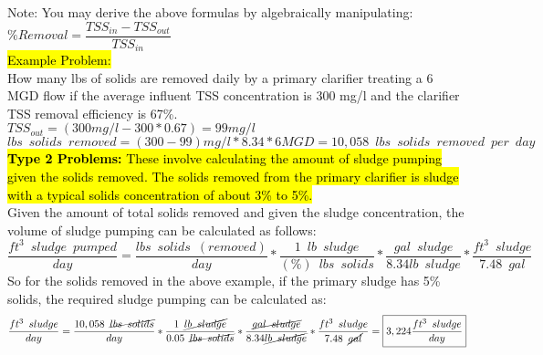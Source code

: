 Note:  You may derive the above formulas by algebraically manipulating: $\%Removal=\dfrac{TSS_{in} -TSS_{out}}{TSS_{in}}$\\
\hl{Example Problem:}\\
How many lbs of solids are removed daily by a primary clarifier treating a 6 MGD flow if the average influent TSS concentration is 300 mg/l and the clarifier TSS removal efficiency is 67\%.\\
$TSS_{out}=(300mg/l - 300*0.67)=99mg/l$\\
$lbs \enspace solids \enspace  removed = (300-99)mg/l*8.34*6MGD=\boxed{10,058 \enspace lbs \enspace solids \enspace removed \enspace per \enspace day}$\\
\vspace{0.5cm}
\hl{\textbf{Type 2 Problems:}  These involve calculating the amount of sludge pumping given the solids removed.  The solids removed from the primary clarifier is sludge with a typical solids concentration of about 3\% to 5\%.}\\
Given the amount of total solids removed and given the sludge concentration, the volume of sludge pumping can be calculated as follows:  $$\dfrac{ft^3\enspace sludge\enspace pumped}{ day}= \dfrac{lbs \enspace solids \enspace (removed)}{day} * \dfrac{1 \enspace lb \enspace sludge}{(\%)\enspace lbs \enspace solids}*\dfrac{gal \enspace sludge}{8.34lb \enspace sludge}*\dfrac{ft^3 \enspace sludge}{7.48 \enspace gal} $$
So for the solids removed in the above example, if the primary sludge has 5\% solids, the required sludge pumping can be calculated as:
$$\dfrac{ft^3\enspace sludge}{day}= \dfrac{10,058 \enspace \cancel{lbs \enspace solids}}{day} * \dfrac{1 \enspace \cancel{lb \enspace sludge}}{0.05\enspace \cancel{lbs \enspace solids}}*\dfrac{\cancel{gal \enspace sludge}}{8.34\cancel{lb \enspace sludge}}*\dfrac{ft^3 \enspace sludge}{7.48 \enspace \cancel{gal}}=\boxed{3,224\dfrac{ft^3 \enspace sludge}{day}} $$
